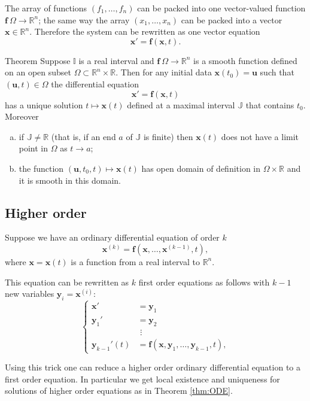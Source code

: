 The array of functions $(f_1,\dots,f_n)$ can be packed into one vector-valued function 
$\bm{f}\:\Omega\to \mathbb{R}^n$;
the same way the array $(x_1,\dots,x_n)$ can be packed into a vector  $\bm{x}\in\mathbb{R}^n$.
Therefore the system can be rewritten as one vector equation 
\[\bm{x}'=\bm{f}(\bm{x}, t).\] 

\begin{thm}{Theorem}\label{thm:ODE}
Suppose $\mathbb{I}$ is a real interval and $\bm{f}\:\Omega\to \mathbb{R}^n$ is a smooth function defined on an open subset $\Omega\subset \mathbb{R}^n\times \mathbb{R}$.
Then for any initial data $\bm{x}(t_0)=\bm{u}$ such that $(\bm{u},t)\in\Omega$ the differential equation 
\[\bm{x}'=\bm{f}(\bm{x},t)\]
has a unique solution $t\mapsto \bm{x}(t)$ defined at a maximal interval $\mathbb{J}$ that contains $t_0$.
Moreover
\begin{enumerate}[(a)]
\item  if $\mathbb{J}\ne \mathbb{R}$ (that is, if an end $a$ of $\mathbb{J}$ is finite) then $\bm{x}(t)$ does not have a limit point in $\Omega$ as $t\to a$;
\item  the function $(\bm{u},t_0,t)\mapsto \bm{x}(t)$ has open domain of definition in $\Omega\times \mathbb{R}$ and it is smooth in this domain.
\end{enumerate}

\end{thm}

\subsection*{Higher order}

Suppose we have an ordinary differential equation of order $k$
\[\bm{x}^{(k)}=\bm{f}(\bm{x},\dots,\bm{x}^{(k-1)},t),\]
where $\bm{x}=\bm{x}(t)$ is a function from a real interval to $\mathbb{R}^n$.

This equation can be rewritten as $k$ first order equations as follows with $k-1$ new variables $\bm{y}_i=\bm{x}^{(i)}$:
\[
\begin{cases}
\bm{x}'&=\bm{y}_1
\\
\bm{y}_1'&=\bm{y}_2
\\
&\,\,\vdots
\\
\bm{y}_{k-1}'(t)&=\bm{f}(\bm{x},\bm{y}_{1},\dots,\bm{y}_{k-1},t),
\end{cases}
\]

Using this trick one can reduce a higher order ordinary differential equation to a first order equation. 
In particular we get local existence and uniqueness for solutions of higher order equations as in Theorem \ref{thm:ODE}.



